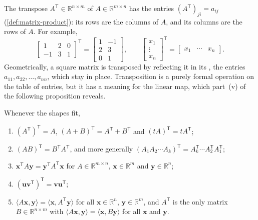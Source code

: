 The transpose $A^{\mathsf T}\in\mathbb R^{n\times m}$ of $A\in\mathbb R^{m\times n}$ has the entries $(A^{\mathsf T})_{ji}=a_{ij}$ (\cref{def:matrix-product}): its rows are the columns of $A$, and its columns are the rows of $A$. For example,
\[
\begin{bmatrix}1&2&0\\-1&3&1\end{bmatrix}^{\mathsf T}=\begin{bmatrix}1&-1\\2&3\\0&1\end{bmatrix},\qquad\begin{bmatrix}x_1\\\vdots\\x_n\end{bmatrix}^{\mathsf T}=\begin{bmatrix}x_1&\cdots&x_n\end{bmatrix}.
\]
Geometrically, a square matrix is transposed by reflecting it in its , the entries $a_{11},a_{22},\ldots,a_{nn}$, which stay in place. Transposition is a purely formal operation on the table of entries, but it has a meaning for the linear map, which part~(v) of the following proposition reveals.

\begin{proposition}
\label{prop:transpose-rules}
Whenever the shapes fit,
\begin{enumerate}
\item $(A^{\mathsf T})^{\mathsf T}=A$, $(A+B)^{\mathsf T}=A^{\mathsf T}+B^{\mathsf T}$ and $(tA)^{\mathsf T}=tA^{\mathsf T}$;
\item $(AB)^{\mathsf T}=B^{\mathsf T}A^{\mathsf T}$, and more generally $(A_1A_2\cdots A_k)^{\mathsf T}=A_k^{\mathsf T}\cdots A_2^{\mathsf T}A_1^{\mathsf T}$;
\item $\mathbf x^{\mathsf T}A\mathbf y=\mathbf y^{\mathsf T}A^{\mathsf T}\mathbf x$ for $A\in\mathbb R^{m\times n}$, $\mathbf x\in\mathbb R^m$ and $\mathbf y\in\mathbb R^n$;
\item $(\mathbf u\mathbf v^{\mathsf T})^{\mathsf T}=\mathbf v\mathbf u^{\mathsf T}$;
\item $\langle A\mathbf x,\mathbf y\rangle=\langle\mathbf x,A^{\mathsf T}\mathbf y\rangle$ for all $\mathbf x\in\mathbb R^n$, $\mathbf y\in\mathbb R^m$, and $A^{\mathsf T}$ is the only matrix $B\in\mathbb R^{n\times m}$ with $\langle A\mathbf x,\mathbf y\rangle=\langle\mathbf x,B\mathbf y\rangle$ for all $\mathbf x$ and $\mathbf y$.
\end{enumerate}
\end{proposition}

